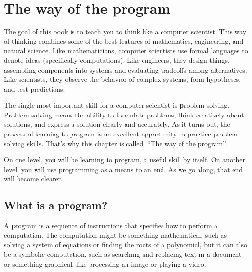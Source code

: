 \documentclass[
DIV=11,
fontsize=12,
twoside,
headinclude=false,
titlepage=firstiscover,
abstract=true,
headsepline=true,
footsepline=true,
chapterprefix=true, %
headings=big,
bibliography=totoc,%
captions=tableheading
]{scrbook}
\theoremstyle{definition}
\begin{document}
\normalsize
\clearemptydoublepage

\begin{latexonly}

\tableofcontents

\clearemptydoublepage

\end{latexonly}

\mainmatter

\chapter{The way of the program}

The goal of this book is to teach you to think like a computer
scientist.  This way of thinking combines some of the best features of
mathematics, engineering, and natural science.  Like mathematicians,
computer scientists use formal languages to denote ideas (specifically
computations).  Like engineers, they design things, assembling
components into systems and evaluating tradeoffs among alternatives.
Like scientists, they observe the behavior of complex systems, form
hypotheses, and test predictions.  

The single most important skill for a computer scientist is {\textbf
  problem solving}.  Problem solving means the ability to formulate
problems, think creatively about solutions, and express a solution
clearly and accurately.  As it turns out, the process of learning to
program is an excellent opportunity to practice problem-solving
skills.  That's why this chapter is called, ``The way of the
program''.

On one level, you will be learning to program, a useful skill by
itself.  On another level, you will use programming as a means to an
end.  As we go along, that end will become clearer.


\section{What is a program?}

A {\textbf program} is a sequence of instructions that specifies how to
perform a computation.  The computation might be something
mathematical, such as solving a system of equations or finding the
roots of a polynomial, but it can also be a symbolic computation, such
as searching and replacing text in a document or something
graphical, like processing an image or playing a video.
\end{document}
